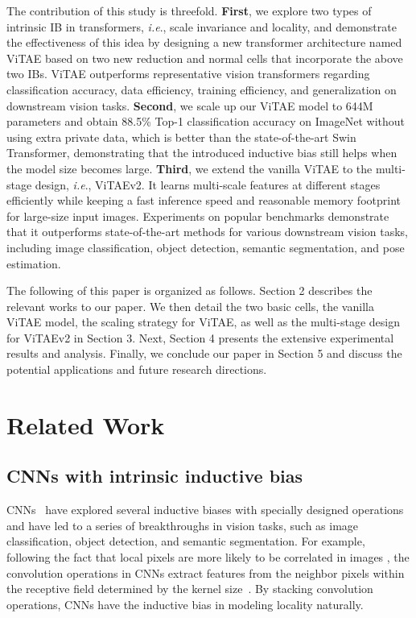 \documentclass[twocolumn]{svjour3}          \smartqed  \usepackage{natbib}
\newcommand{\ie}{i.e}
\def\onedot{.\xspace}
\def\ie{\emph{i.e}\onedot}
\begin{document}
The contribution of this study is threefold. \textbf{First}, we explore two types of intrinsic IB in transformers, \ie, scale invariance and locality, and demonstrate the effectiveness of this idea by designing a new transformer architecture named ViTAE based on two new reduction and normal cells that incorporate the above two IBs. ViTAE outperforms representative vision transformers regarding classification accuracy, data efficiency, training efficiency, and generalization on downstream vision tasks. \textbf{Second}, we scale up our ViTAE model to 644M parameters and obtain 88.5\% Top-1 classification accuracy on ImageNet without using extra private data, which is better than the state-of-the-art Swin Transformer, demonstrating that the introduced inductive bias still helps when the model size becomes large. \textbf{Third}, we extend the vanilla ViTAE to the multi-stage design, \ie, ViTAEv2. It learns multi-scale features at different stages efficiently while keeping a fast inference speed and reasonable memory footprint for large-size input images. Experiments on popular benchmarks demonstrate that it outperforms state-of-the-art methods for various downstream vision tasks, including image classification, object detection, semantic segmentation, and pose estimation. 

The following of this paper is organized as follows. Section 2 describes the relevant works to our paper. We then detail the two basic cells, the vanilla ViTAE model, the scaling strategy for ViTAE, as well as the multi-stage design for ViTAEv2 in Section 3. Next, Section 4 presents the extensive experimental results and analysis. Finally, we conclude our paper in Section 5 and discuss the potential applications and future research directions.

\section{Related Work}
\label{related work}
\subsection{CNNs with intrinsic inductive bias}

CNNs~\citep{krizhevsky2012imagenet,zeiler2014visualizing,he2016deep} have explored several inductive biases with specially designed operations and have led to a series of breakthroughs in vision tasks, such as image classification, object detection, and semantic segmentation. For example, following the fact that local pixels are more likely to be correlated in images \citep{lecun1995convolutional}, the convolution operations in CNNs extract features from the neighbor pixels within the receptive field determined by the kernel size~\citep{lecun2015deep}. By stacking convolution operations, CNNs have the inductive bias in modeling locality naturally.
\end{document}
